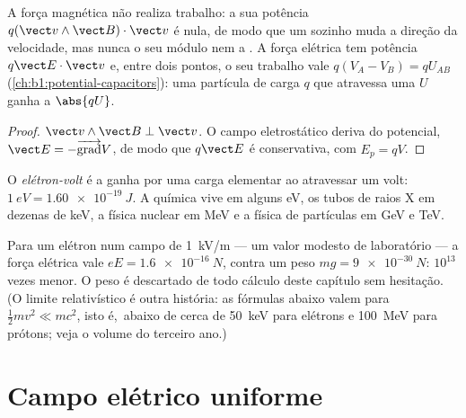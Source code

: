 \begin{proposition}\label{prop:b1:charged-particles:work}
A força magnética não realiza trabalho: a sua potência $q(\vect v\wedge\vect B)\cdot\vect v$
é nula, de modo que um  sozinho muda a direção da velocidade,
mas nunca o seu módulo nem a . A força elétrica tem potência
$q\vect E\cdot\vect v$ e, entre dois pontos, o seu trabalho vale $q(V_A - V_B) =
qU_{AB}$ (\cref{ch:b1:potential-capacitors}): uma partícula de carga $q$
que atravessa uma  $U$ ganha a  $\abs{qU}$.
\end{proposition}

\begin{proof}
$\vect v\wedge\vect B \perp \vect v$. O campo eletrostático deriva do
potencial, $\vect E = -\overrightarrow{\operatorname{grad}}V$, de modo que $q\vect E$
é conservativa, com $E_p = qV$.
\end{proof}

\begin{definition}\label{def:b1:charged-particles:eV}
O \emph{elétron-volt} é a  ganha por uma carga
elementar ao atravessar um volt: $\qty{1}{eV} = \qty{1.60e-19}{J}$. A química
vive em alguns eV, os tubos de raios X em dezenas de keV, a física nuclear em MeV
e a física de partículas em GeV e TeV.
\end{definition}

\begin{remark}\label{rem:b1:charged-particles:gravity}
Para um elétron num campo de \qty{1}{kV/m} --- um valor modesto de
laboratório --- a força elétrica vale $eE = \qty{1.6e-16}{N}$, contra um peso
$mg = \qty{9e-30}{N}$: $10^{13}$ vezes menor. O peso é descartado de
todo cálculo deste capítulo sem hesitação. (O limite
relativístico é outra história: as fórmulas abaixo valem para
$\tfrac12 mv^2 \ll mc^2$, isto é,\ abaixo de cerca de \qty{50}{keV} para elétrons
e \qty{100}{MeV} para prótons; veja o volume do terceiro ano.)
\end{remark}

\section{Campo elétrico uniforme}

